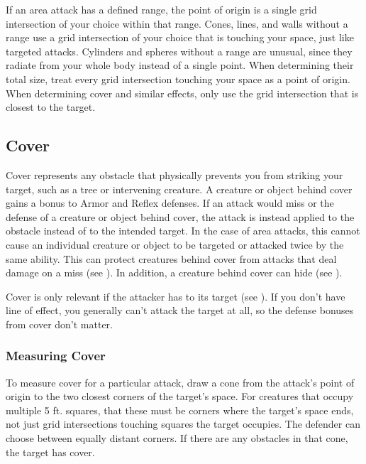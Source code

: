    If an area attack has a defined range, the point of origin is a single grid intersection of your choice within that range.
    Cones, lines, and walls without a range use a grid intersection of your choice that is touching your space, just like targeted attacks.
    Cylinders and spheres without a range are unusual, since they radiate from your whole body instead of a single point.
    When determining their total size, treat every grid intersection touching your space as a point of origin.
    When determining cover and similar effects, only use the grid intersection that is closest to the target.

  \subsection{Cover}\label{Cover}

    Cover represents any obstacle that physically prevents you from striking your target, such as a tree or intervening creature.
    A creature or object behind cover gains a  bonus to Armor and Reflex defenses.
    If an attack would miss or  the defense of a creature or object behind cover,
    the attack is instead applied to the obstacle instead of to the intended target.
    In the case of area attacks, this cannot cause an individual creature or object to be targeted or attacked twice by the same ability.
    This can protect creatures behind cover from attacks that deal damage on a miss (see ).
    In addition, a creature behind cover can hide (see ).

    Cover is only relevant if the attacker has  to its target (see ).
    If you don't have line of effect, you generally can't attack the target at all, so the defense bonuses from cover don't matter.

    \subsubsection{Measuring Cover}
      To measure cover for a particular attack, draw a cone from the attack's point of origin to the two closest corners of the target's space.
      For creatures that occupy multiple 5 ft. squares, that these must be corners where the target's space ends, not just grid intersections touching squares the target occupies.
      The defender can choose between equally distant corners.
      If there are any obstacles in that cone, the target has cover.

